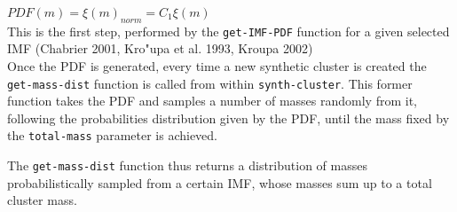 \documentclass[10pt]{article}
\begin{document}
$PDF(m) = \xi(m)_{norm} = C_1 \xi(m) $\\

This is the first step, performed by the \texttt{get-IMF-PDF} function for a given selected
IMF (Chabrier 2001, Kro"upa et al. 1993, Kroupa 2002)\\


Once the PDF is generated, every time a new synthetic cluster is created the
\texttt{get-mass-dist} function is called from within \texttt{synth-cluster}. This
former function takes the PDF and samples a number of masses randomly from it, following
the probabilities distribution given by the PDF, until the mass fixed by the
\texttt{total-mass} parameter is achieved.

The \texttt{get-mass-dist} function thus returns a distribution of masses probabilistically
sampled from a certain IMF, whose masses sum up to a total cluster mass.
\end{document}

